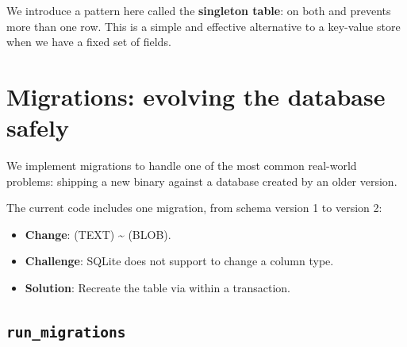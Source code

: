 We introduce a pattern here called the \textbf{singleton table}:  on both  and  prevents more than one row. This is a simple and effective alternative to a key-value store when we have a fixed set of fields.

\section{Migrations: evolving the database safely}
\label{sec:migrations}

We implement migrations to handle one of the most common real-world problems: shipping a new binary against a database created by an older version.

The current code includes one migration, from schema version 1 to version 2:

\begin{itemize}
  \item \textbf{Change}:  (TEXT) \textasciitilde{}  (BLOB).
  \item \textbf{Challenge}: SQLite does not support  to change a column type.
  \item \textbf{Solution}: Recreate the table via  within a transaction.
\end{itemize}

\subsection{\texttt{run\_migrations}}
\label{sec:run-migrations}

